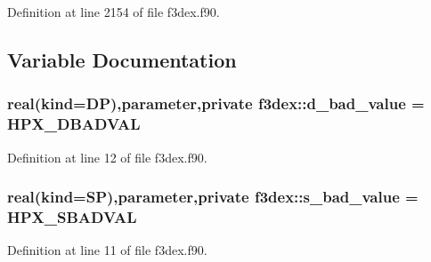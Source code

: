 Definition at line 2154 of file f3dex.f90.



\subsection{Variable Documentation}
\hypertarget{namespacef3dex_af925e5023c935decb72a6698b234045d}{
\subsubsection[{d\_\-bad\_\-value}]{\setlength{\rightskip}{0pt plus 5cm}real(kind=DP),parameter,private {\bf f3dex::d\_\-bad\_\-value} = HPX\_\-DBADVAL}}
\label{namespacef3dex_af925e5023c935decb72a6698b234045d}


Definition at line 12 of file f3dex.f90.

\hypertarget{namespacef3dex_a5d027a15cdc55f7ea6b40a075c6f9eb8}{
\subsubsection[{s\_\-bad\_\-value}]{\setlength{\rightskip}{0pt plus 5cm}real(kind=SP),parameter,private {\bf f3dex::s\_\-bad\_\-value} = HPX\_\-SBADVAL}}
\label{namespacef3dex_a5d027a15cdc55f7ea6b40a075c6f9eb8}


Definition at line 11 of file f3dex.f90.

